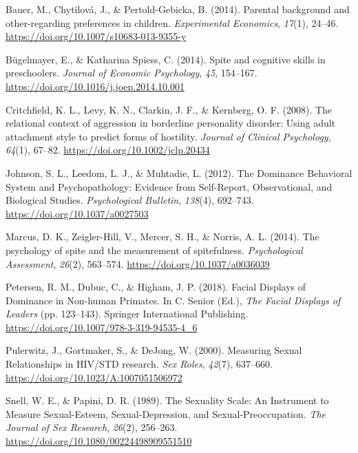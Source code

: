 \documentclass[
  english,
  a4paper]{apa7}
\newlength{\cslhangindent}
\newlength{\cslentryspacingunit} %
\newenvironment{CSLReferences}[2] %
 {%
  \setlength{\parindent}{0pt}
  \ifodd #1
  \let\oldpar\par
  \def\par{\hangindent=\cslhangindent\oldpar}
  \fi
  \setlength{\parskip}{#2\cslentryspacingunit}
 }%
 {}
\begin{document}
\hypertarget{refs}{}
\begin{CSLReferences}{1}{0}
\leavevmode{}%
Bauer, M., Chytilová, J., \& Pertold-Gebicka, B. (2014). Parental background and other-regarding preferences in children. \emph{Experimental Economics}, \emph{17}(1), 24--46. \url{https://doi.org/10.1007/s10683-013-9355-y}

\leavevmode{}%
Bügelmayer, E., \& Katharina Spiess, C. (2014). Spite and cognitive skills in preschoolers. \emph{Journal of Economic Psychology}, \emph{45}, 154--167. \url{https://doi.org/10.1016/j.joep.2014.10.001}

\leavevmode{}%
Critchfield, K. L., Levy, K. N., Clarkin, J. F., \& Kernberg, O. F. (2008). The relational context of aggression in borderline personality disorder: Using adult attachment style to predict forms of hostility. \emph{Journal of Clinical Psychology}, \emph{64}(1), 67--82. \url{https://doi.org/10.1002/jclp.20434}

\leavevmode{}%
Johnson, S. L., Leedom, L. J., \& Muhtadie, L. (2012). The {Dominance} {Behavioral} {System} and {Psychopathology}: {Evidence} from {Self}-{Report}, {Observational}, and {Biological} {Studies}. \emph{Psychological Bulletin}, \emph{138}(4), 692--743. \url{https://doi.org/10.1037/a0027503}

\leavevmode{}%
Marcus, D. K., Zeigler-Hill, V., Mercer, S. H., \& Norris, A. L. (2014). The psychology of spite and the measurement of spitefulness. \emph{Psychological Assessment}, \emph{26}(2), 563--574. \url{https://doi.org/10.1037/a0036039}

\leavevmode{}%
Petersen, R. M., Dubuc, C., \& Higham, J. P. (2018). Facial {Displays} of {Dominance} in {Non}-human {Primates}. In C. Senior (Ed.), \emph{The {Facial} {Displays} of {Leaders}} (pp. 123--143). Springer International Publishing. \url{https://doi.org/10.1007/978-3-319-94535-4_6}

\leavevmode{}%
Pulerwitz, J., Gortmaker, S., \& DeJong, W. (2000). Measuring {Sexual} {Relationships} in {HIV}/{STD} research. \emph{Sex Roles}, \emph{42}(7), 637--660. \url{https://doi.org/10.1023/A:1007051506972}

\leavevmode{}%
Snell, W. E., \& Papini, D. R. (1989). The {Sexuality} {Scale}: {An} {Instrument} to {Measure} {Sexual}-{Esteem}, {Sexual}-{Depression}, and {Sexual}-{Preoccupation}. \emph{The Journal of Sex Research}, \emph{26}(2), 256--263. \url{https://doi.org/10.1080/00224498909551510}


\end{CSLReferences}
\end{document}
